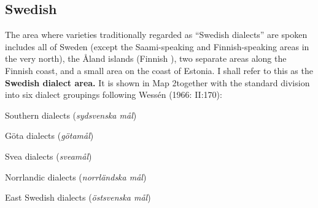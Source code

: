 \subsection{ Swedish}
\label{bkm:Ref108607742}
The area where varieties traditionally regarded as “Swedish dialects” are spoken includes all of Sweden (except the Saami-speaking and Finnish-speaking areas in the very north), the Åland islands (Finnish ), two separate areas along the Finnish coast, and a small area on the coast of Estonia. I shall refer to this as the \textbf{Swedish dialect area.} It is shown in Map 2together with the standard division into six dialect groupings following Wessén (1966: II:170): 


\item 

Southern dialects (\textit{sydsvenska mål})


\item 

Göta dialects (\textit{götamål})


\item 

Svea dialects (\textit{sveamål})


\item 

Norrlandic dialects (\textit{norrländska mål})


\item 

East Swedish dialects (\textit{östsvenska mål})


